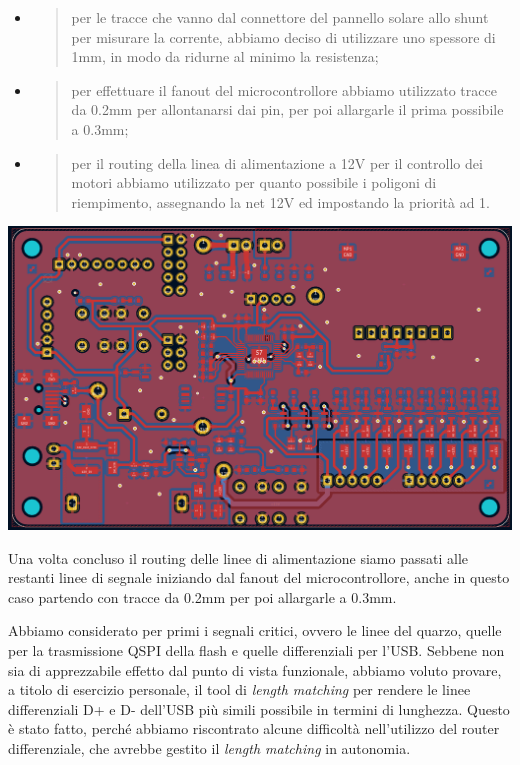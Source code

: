 \begin{itemize}
\item
  \begin{quote}
  per le tracce che vanno dal connettore del pannello solare allo shunt
  per misurare la corrente, abbiamo deciso di utilizzare uno spessore di
  1mm, in modo da ridurne al minimo la resistenza;
  \end{quote}
\item
  \begin{quote}
  per effettuare il fanout del microcontrollore abbiamo utilizzato
  tracce da 0.2mm per allontanarsi dai pin, per poi allargarle il prima
  possibile a 0.3mm;
  \end{quote}
\item
  \begin{quote}
  per il routing della linea di alimentazione a 12V per il controllo dei
  motori abbiamo utilizzato per quanto possibile i poligoni di
  riempimento, assegnando la net 12V ed impostando la priorità ad 1.
  \end{quote}
\end{itemize}

\begin{center}
\includegraphics[scale=0.2]{figures/image77.png}
\captionsetup{type=figure}
\end{center}

Una volta concluso il routing delle linee di alimentazione siamo passati
alle restanti linee di segnale iniziando dal fanout del
microcontrollore, anche in questo caso partendo con tracce da 0.2mm per
poi allargarle a 0.3mm.

Abbiamo considerato per primi i segnali critici, ovvero le linee del
quarzo, quelle per la trasmissione QSPI della flash e quelle
differenziali per l'USB. Sebbene non sia di apprezzabile effetto dal
punto di vista funzionale, abbiamo voluto provare, a titolo di esercizio
personale, il tool di \emph{length matching} per rendere le linee
differenziali D+ e D- dell'USB più simili possibile in termini di
lunghezza. Questo è stato fatto, perché abbiamo riscontrato alcune
difficoltà nell'utilizzo del router differenziale, che avrebbe gestito
il \emph{length matching} in autonomia.

